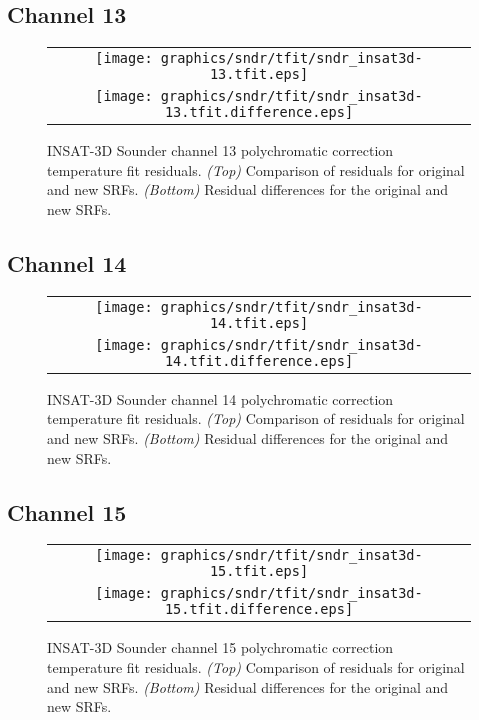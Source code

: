 \subsection{Channel 13}
\begin{figure}[H]
  \label{fig:sndr_ch13_tfit}
  \centering
  \begin{tabular}{c}
    \texttt{[image: graphics/sndr/tfit/sndr\_insat3d-13.tfit.eps]} \\
    \texttt{[image: graphics/sndr/tfit/sndr\_insat3d-13.tfit.difference.eps]}
  \end{tabular}
  \caption{INSAT-3D Sounder channel 13 polychromatic correction temperature fit residuals. \emph{(Top)} Comparison of residuals for original and new SRFs. \emph{(Bottom)} Residual differences for the original and new SRFs.}
\end{figure}

\subsection{Channel 14}
\begin{figure}[H]
  \label{fig:sndr_ch14_tfit}
  \centering
  \begin{tabular}{c}
    \texttt{[image: graphics/sndr/tfit/sndr\_insat3d-14.tfit.eps]} \\
    \texttt{[image: graphics/sndr/tfit/sndr\_insat3d-14.tfit.difference.eps]}
  \end{tabular}
  \caption{INSAT-3D Sounder channel 14 polychromatic correction temperature fit residuals. \emph{(Top)} Comparison of residuals for original and new SRFs. \emph{(Bottom)} Residual differences for the original and new SRFs.}
\end{figure}

\subsection{Channel 15}
\begin{figure}[H]
  \label{fig:sndr_ch15_tfit}
  \centering
  \begin{tabular}{c}
    \texttt{[image: graphics/sndr/tfit/sndr\_insat3d-15.tfit.eps]} \\
    \texttt{[image: graphics/sndr/tfit/sndr\_insat3d-15.tfit.difference.eps]}
  \end{tabular}
  \caption{INSAT-3D Sounder channel 15 polychromatic correction temperature fit residuals. \emph{(Top)} Comparison of residuals for original and new SRFs. \emph{(Bottom)} Residual differences for the original and new SRFs.}
\end{figure}

